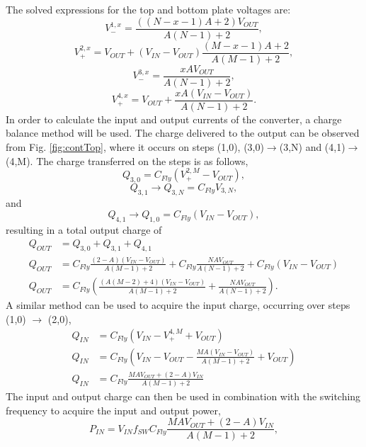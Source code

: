 \documentclass[conference]{article}
\begin{document}
	The solved expressions for the top and bottom plate voltages are:
	\begin{equation}
	V_{-}^{1,x} = \frac{((N-x-1)A + 2)V_{OUT}}{A(N-1) + 2},
	\end{equation}
	\begin{equation}
	V_{+}^{2,x} = V_{OUT} + (V_{IN} -V_{OUT})\frac{(M-x-1)A + 2}{A(M-1) + 2},
	\end{equation}
	\begin{equation}
	V_{-}^{3,x} = \frac{xAV_{OUT}}{A(N-1) + 2},
	\end{equation}
	\begin{equation}
	V_{+}^{4,x} = V_{OUT} + \frac{xA(V_{IN} -V_{OUT})}{A(N-1) + 2}.
	\end{equation}
	In order to calculate the input and output currents of the converter, a charge balance method will be used. The charge delivered to the output can be observed from Fig. \ref{fig:contTop}, where it occurs on steps (1,0), (3,0)$\rightarrow$(3,N) and (4,1)$\rightarrow$(4,M). The charge transferred on the steps is as follows,
	\begin{equation}
	Q_{3,0} = C_{Fly}(V_+^{2,M} - V_{OUT}),
	\end{equation}
	\begin{equation}
	Q_{3,1} \rightarrow  Q_{3,N} = C_{Fly}V_{3,N},
	\end{equation}
	and
	\begin{equation}
	Q_{4,1} \rightarrow  Q_{1,0} = C_{Fly}(V_{IN} - V_{OUT}),
	\end{equation}
	resulting in a total output charge of 
	\begin{equation}
	\begin{split}
	Q_{OUT} &= Q_{3,0} + Q_{3,1} + Q_{4,1}\\
	Q_{OUT} &= C_{Fly}\frac{(2-A)(V_{IN} - V_{OUT})}{A(M-1) + 2} + C_{Fly}\frac{NAV_{OUT}}{A(N-1) + 2} + C_{Fly}(V_{IN} - V_{OUT}) \\ 
	Q_{OUT} &= C_{Fly}\left(\frac{(A(M-2) + 4)(V_{IN} - V_{OUT})}{A(M-1) + 2} + \frac{NAV_{OUT}}{A(N-1) + 2}\right).
	\end{split}
 	\end{equation}
 	A similar method can be used to acquire the input charge, occurring over steps (1,0) $\rightarrow$ (2,0),
 	\begin{equation}
 	\begin{split}
 	Q_{IN} &= C_{Fly}\left(V_{IN} - V_+^{4,M} + V_{OUT}\right) \\
 	Q_{IN} &= C_{Fly}\left(V_{IN} - V_{OUT} - \frac{MA(V_{IN} -V_{OUT})}{A(M-1) + 2} + V_{OUT}\right) \\
 	Q_{IN} &= C_{Fly}\frac{MAV_{OUT} + (2-A)V_{IN}}{A(M-1) + 2}
 	\end{split}
 	\end{equation}
 	The input and output charge can then be used in combination with the switching frequency to acquire the input and output power,
 	\begin{equation}
 	P_{IN} = V_{IN}f_{SW}C_{Fly}\frac{MAV_{OUT} + (2-A)V_{IN}}{A(M-1) + 2},
 	\label{eq:P_IN}
 	\end{equation}
 	
\end{document}
